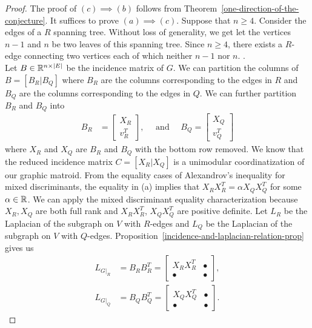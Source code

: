 \documentclass{puthesis-UG}
\begin{document}
\begin{proof}
	The proof of $(c) \implies (b)$ follows from Theorem~\ref{one-direction-of-the-conjecture}. It suffices to prove $(a) \implies (c)$. Suppose that $n \geq 4$. Consider the edges of a $R$ spanning tree. Without loss of generality, we get let the vertices $n-1$ and $n$ be two leaves of this spanning tree. Since $n \geq 4$, there exists a $R$-edge connecting two vertices each of which neither $n-1$ nor $n$. . \\

	Let $B \in \mathbb{R}^{n \times |E|}$ be the incidence matrix of $G$. We can partition the columns of $B = [B_R | B_Q]$ where $B_R$ are the columns corresponding to the edges in $R$ and $B_Q$ are the columns corresponding to the edges in $Q$. We can further partition $B_R$ and $B_Q$ into
	\begin{align*}
		B_R & = \begin{bmatrix} X_R \\ v_R^T \end{bmatrix}, \quad \text{ and } \quad B_Q = \begin{bmatrix} X_Q \\ v_Q^T \end{bmatrix}
	\end{align*}
	where $X_R$ and $X_Q$ are $B_R$ and $B_Q$ with the bottom row removed. We know that the reduced incidence matrix $C = [X_R | X_Q]$ is a unimodular coordinatization of our graphic matroid. From the equality cases of Alexandrov's inequality for mixed discriminants, the equality in (a) implies that $X_RX_R^T = \alpha X_Q X_Q^T$ for some $\alpha \in \mathbb{R}$. We can apply the mixed discriminant equality characterization because $X_R, X_Q$ are both full rank and $X_RX_R^T$, $X_QX_Q^T$ are positive definite. Let $L_R$ be the Laplacian of the subgraph on $V$ with $R$-edges and $L_Q$ be the Laplacian of the subgraph on $V$ with $Q$-edges. Proposition~\ref{incidence-and-laplacian-relation-prop} gives us
	\begin{align*}
		L_{G|_R} & = B_R B_R^T = \begin{bmatrix}
			X_RX_R^T & \bullet \\ \bullet & \bullet
		\end{bmatrix}, \\
		L_{G|_Q} & = B_Q B_Q^T = \begin{bmatrix}
			X_Q X_Q^T & \bullet \\ \bullet & \bullet
		\end{bmatrix}.
	\end{align*}

\end{proof}
\end{document}
